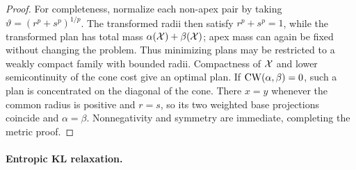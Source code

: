 \begin{proof}
	For completeness, normalize each non-apex pair by taking $\vartheta=(r^p+s^p)^{1/p}$. The transformed radii then satisfy $r^p+s^p=1$, while the transformed plan has total mass $\alpha(\mathcal{X})+\beta(\mathcal{X})$; apex mass can again be fixed without changing the problem. Thus minimizing plans may be restricted to a weakly compact family with bounded radii. Compactness of $\mathcal{X}$ and lower semicontinuity of the cone cost give an optimal plan. If $\operatorname{CW}(\alpha,\beta)=0$, such a plan is concentrated on the diagonal of the cone. There $x=y$ whenever the common radius is positive and $r=s$, so its two weighted base projections coincide and $\alpha=\beta$. Nonnegativity and symmetry are immediate, completing the metric proof.
\end{proof}

\paragraph{Entropic KL relaxation.}

